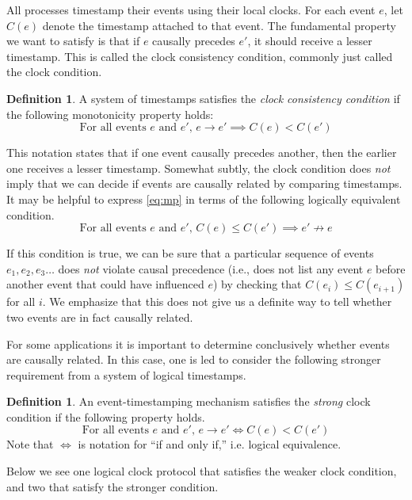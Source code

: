 \documentclass[]             %
{NASA}                       %
\theoremstyle{definition}
\newtheorem{definition}[theorem]{Definition}
\begin{document}
All processes timestamp their events using their local clocks. For
each event $e$, let $C(e)$ denote the timestamp attached to that
event. The fundamental property we want to satisfy is that if $e$
causally precedes $e'$, it should receive a lesser timestamp. This is
called the clock consistency condition, commonly just called the clock condition.

\begin{definition}
  A system of timestamps satisfies the \emph{clock consistency
  condition} if the following monotonicity property holds:
  \[ \textrm{For all events $e$ and $e'$, } e \to e' \implies C(e) < C(e') \label{eq:mp}\tag{CC} \]
\end{definition}

This notation states that if one event causally precedes another, then
the earlier one receives a lesser timestamp. Somewhat subtly, the
clock condition does \emph{not} imply that we can decide if events are
causally related by comparing timestamps. It may be helpful to express
\eqref{eq:mp} in terms of the following logically equivalent
condition.
\[ \textrm{For all events $e$ and $e'$, }C(e) \leq C(e') \implies e'
  \not\to e \label{eq:mp-conv}\tag{CC$'$} \]

If this condition is true, we can be sure that a particular sequence
of events $e_1, e_2, e_3\ldots$ does \emph{not} violate causal
precedence (i.e., does not list any event $e$ before another event
that could have influenced $e$) by checking that
$C(e_{i}) \leq C(e_{i+1})$ for all $i$. We emphasize that this does
not give us a definite way to tell whether two events are in fact
causally related.

For some applications it is important to determine conclusively
whether events are causally related. In this case, one is led to
consider the following stronger requirement from a system of logical
timestamps.
\begin{definition}
  An event-timestamping mechanism satisfies the \emph{strong} clock   condition if the following property holds.
  \[ \textrm{For all events $e$ and $e'$, } e \to e' \iff C(e) < C(e') \label{eq:sc}\tag{SC} \]
  Note that $\iff$ is notation for ``if and only if,'' i.e. logical equivalence.
\end{definition}
Below we see one logical clock protocol that satisfies the weaker
clock condition, and two that satisfy the stronger condition.
\end{document}

